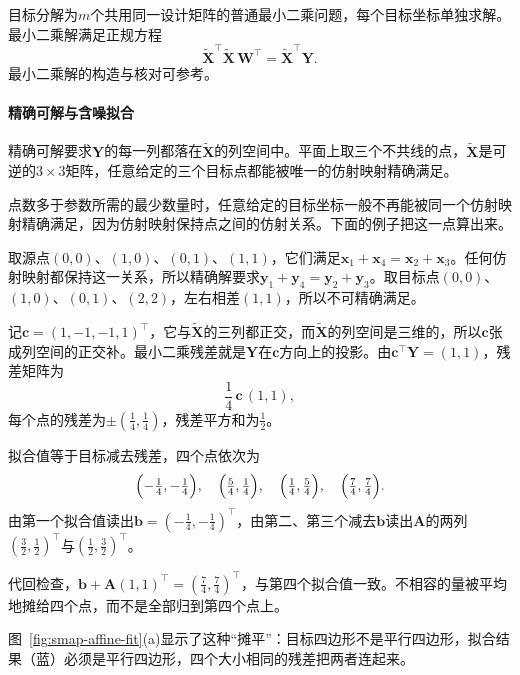 目标分解为$m$个共用同一设计矩阵的普通最小二乘问题，每个目标坐标单独求解。最小二乘解满足正规方程
\begin{equation}
 \widetilde{\bm X}^\top\widetilde{\bm X}\,\bm W^\top=\widetilde{\bm X}^\top\bm Y .
 \label{eq:smap-affine-normal}
\end{equation}
最小二乘解的构造与核对可参考。

\paragraph{精确可解与含噪拟合}

精确可解要求$\bm Y$的每一列都落在$\widetilde{\bm X}$的列空间中。平面上取三个不共线的点，$\widetilde{\bm X}$是可逆的$3\times3$矩阵，任意给定的三个目标点都能被唯一的仿射映射精确满足。

点数多于参数所需的最少数量时，任意给定的目标坐标一般不再能被同一个仿射映射精确满足，因为仿射映射保持点之间的仿射关系。下面的例子把这一点算出来。

\begin{example}[正方形四顶点的仿射拟合]
\label{ex:smap-affine-square}
取源点$(0,0)$、$(1,0)$、$(0,1)$、$(1,1)$，它们满足$\bm x_1+\bm x_4=\bm x_2+\bm x_3$。任何仿射映射都保持这一关系，所以精确解要求$\bm y_1+\bm y_4=\bm y_2+\bm y_3$。取目标点$(0,0)$、$(1,0)$、$(0,1)$、$(2,2)$，左右相差$(1,1)$，所以不可精确满足。

记$\bm c=(1,-1,-1,1)^\top$，它与$\widetilde{\bm X}$的三列都正交，而$\widetilde{\bm X}$的列空间是三维的，所以$\bm c$张成列空间的正交补。最小二乘残差就是$\bm Y$在$\bm c$方向上的投影。由$\bm c^\top\bm Y=(1,1)$，残差矩阵为
\[
 \frac14\,\bm c\,(1,1) ,
\]
每个点的残差为$\pm(\frac14,\frac14)$，残差平方和为$\frac12$。

拟合值等于目标减去残差，四个点依次为
\[
 \Bigl(-\tfrac14,-\tfrac14\Bigr),\quad\Bigl(\tfrac54,\tfrac14\Bigr),\quad\Bigl(\tfrac14,\tfrac54\Bigr),\quad\Bigl(\tfrac74,\tfrac74\Bigr).
\]
由第一个拟合值读出$\bm b=(-\frac14,-\frac14)^\top$，由第二、第三个减去$\bm b$读出$\bm A$的两列$(\frac32,\frac12)^\top$与$(\frac12,\frac32)^\top$。

代回检查，$\bm b+\bm A(1,1)^\top=(\frac74,\frac74)^\top$，与第四个拟合值一致。不相容的量被平均地摊给四个点，而不是全部归到第四个点上。
\end{example}

图~\ref{fig:smap-affine-fit}(a)显示了这种“摊平”：目标四边形不是平行四边形，拟合结果（蓝）必须是平行四边形，四个大小相同的残差把两者连起来。

